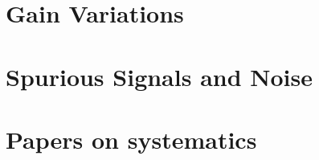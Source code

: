 \documentclass[
12pt, %
letterpaper, %
oneside, %
headinclude,footinclude, %
BCOR5mm, %
]{scrartcl}
\begin{document}
\section{Gain Variations}







\section{Spurious Signals and Noise}






\section{Papers on systematics}




 


\renewcommand{\refname}{\spacedlowsmallcaps{References}} %


\end{document}
